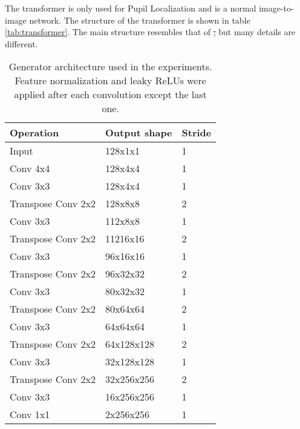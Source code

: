 The transformer is only used for Pupil Localization and is a normal image-to-image network. The structure of the transformer is shown in table \ref{tab:transformer}. The main structure resembles that of \textcite{ronneberger2015u}\st{,} but many details are different. 


\begin{table}[t]
    \centering
    \caption{Generator architecture used in the experiments. Feature normalization and leaky ReLUs were applied after each convolution except the last one.}
    \label{tab:generator}
    \begin{tabular}{|lll|}
        \hline
        Operation          & Output shape     & Stride \\ \hline
        Input              & 128x1x1   & 1      \\
        Conv 4x4           & 128x4x4   & 1      \\
        Conv 3x3           & 128x4x4   & 1      \\ \hline
        Transpose Conv 2x2 & 128x8x8   & 2      \\
        Conv 3x3           & 112x8x8   & 1      \\ \hline
        Transpose Conv 2x2 & 11216x16   & 2      \\
        Conv 3x3           & 96x16x16   & 1      \\ \hline
        Transpose Conv 2x2 & 96x32x32   & 2      \\
        Conv 3x3           & 80x32x32   & 1      \\ \hline
        Transpose Conv 2x2 & 80x64x64   & 2      \\
        Conv 3x3           & 64x64x64   & 1      \\ \hline
        Transpose Conv 2x2 & 64x128x128   & 2      \\
        Conv 3x3           & 32x128x128   & 1      \\ \hline
        Transpose Conv 2x2 & 32x256x256   & 2      \\
        Conv 3x3           & 16x256x256   & 1      \\ \hline
        Conv 1x1           & 2x256x256 & 1        \\ \hline
    \end{tabular}
\end{table}

